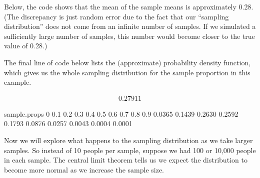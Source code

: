 \documentclass[letterpaper,10pt,english]{jupyterBook}
\begin{document}
\sphinxAtStartPar
Below, the code shows that the mean of the sample means is approximately 0.28. (The discrepancy is just random error due to the fact that our “sampling distribution” does not come from an infinite number of samples. If we simulated a sufficiently large number of samples, this number would become closer to the true value of 0.28.)

\sphinxAtStartPar
The final line of code below lists the (approximate) probability density function, which gives us the whole sampling distribution for the sample proportion in this example.

\begin{sphinxVerbatim}[commandchars=\\\{\}]


\end{sphinxVerbatim}
\begin{equation*}
\begin{split}0.27911\end{split}
\end{equation*}
\begin{sphinxVerbatim}[commandchars=\\\{\}]
sample.props
     0    0.1    0.2    0.3    0.4    0.5    0.6    0.7    0.8    0.9 
0.0365 0.1439 0.2630 0.2592 0.1793 0.0876 0.0257 0.0043 0.0004 0.0001 
\end{sphinxVerbatim}

\sphinxAtStartPar
Now we will explore what happens to the sampling distribution as we take larger samples. So instead of 10 people per sample, suppose we had 100 or 10,000 people in each sample. The central limit theorem tells us we expect the distribution to become more normal as we increase the sample size.
\end{document}

